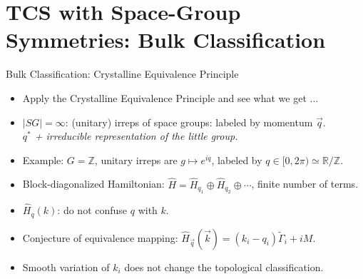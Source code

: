 \documentclass[xcolor=table, 11pt, aspectratio=169]{beamer}
\begin{document}
  \section{TCS with Space-Group Symmetries: Bulk Classification}

  \begin{frame}{Bulk Classification: Crystalline Equivalence Principle}
    \begin{itemize}
      \item<1-> Apply the Crystalline Equivalence Principle and see what we get ...
      \item<2-> $|SG|=\infty$: (unitary) irreps of space groups: labeled by momentum $\vec q$.\\
      \emph{$q^\ast$ + irreducible representation of the little group.}
      \item<3-> Example: $G=\mathbb Z$, unitary irreps are $g\mapsto e^{iq}$, labeled by $q\in [0,2\pi)\simeq\mathbb R/\mathbb Z$.
      \item<4-> Block-diagonalized Hamiltonian: $\hat H=\hat H_{q_1}\oplus\hat H_{q_2}\oplus\cdots$, \alert{finite} number of terms.
      \item<5-> $\hat H_q(k)$: do not confuse $q$ with $k$.
      \item<6-> Conjecture of equivalence mapping: $\hat H_{\vec q}(\vec k)=(k_i-q_i)\tilde\Gamma_i+iM$.
      \item<7-> Smooth variation of $k_i$ does not change the topological classification.
    \end{itemize}
    \begin{center}
    \begin{animateinline}{30}
      \multiframe{100}{Ra=1.5+-0.01}{
      \begin{tikzpicture}[scale=2]
          \draw [->] (0, 0) -- (2, 0) node [right] {$k$};
          \draw [blue] (\Ra-0.3, -0.5) -- (\Ra+0.3, 0.5);
          \draw [blue] (\Ra+0.3, -0.5) -- (\Ra-0.3, 0.5);
        \end{tikzpicture}
      }
    \end{animateinline}      
    \end{center}
  \end{frame}
\end{document}
